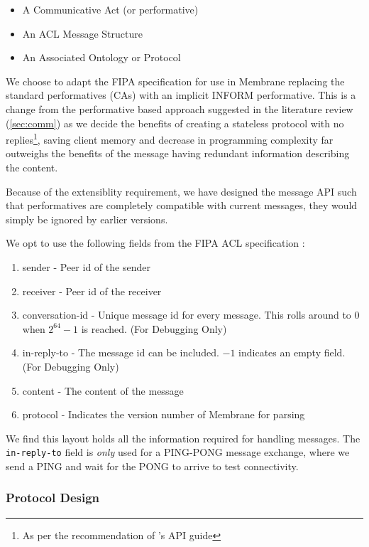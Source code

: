 \documentclass[11pt, a4paper, twoside]{report}
\def\code#1{\texttt{#1}}
\begin{document}
\begin{itemize}
 \item A Communicative Act (or performative)
 \item An ACL Message Structure
 \item An Associated Ontology or Protocol
\end{itemize}

We choose to adapt the FIPA specification for use in Membrane replacing the standard performatives (CAs) with an implicit INFORM performative. This is a change from the performative based approach suggested in the literature review (\ref{sec:comm}) as we decide the benefits of creating a stateless protocol with no replies\footnote{As per the recommendation of \citep{google2017api}'s API guide}, saving client memory and decrease in programming complexity far outweighs the benefits of the message having redundant information describing the content.

Because of the extensiblity requirement, we have designed the message API such that performatives are completely compatible with current messages, they would simply be ignored by earlier versions.

We opt to use the following fields from the FIPA ACL specification \citep{fipa2002fipa}:

\begin{enumerate}
 \item sender - Peer id of the sender
 \item receiver - Peer id of the receiver
 \item conversation-id - Unique message id for every message. This rolls around to $0$ when $2^{64}-1$ is reached. (For Debugging Only)
 \item in-reply-to - The message id can be included. $-1$ indicates an empty field. (For Debugging Only)
 \item content - The content of the message
 \item protocol - Indicates the version number of Membrane for parsing
\end{enumerate}

We find this layout holds all the information required for handling messages. The \code{in-reply-to} field is \emph{only} used for a PING-PONG message exchange, where we send a PING and wait for the PONG to arrive to test connectivity.

\subsubsection{Protocol Design}
\end{document}
